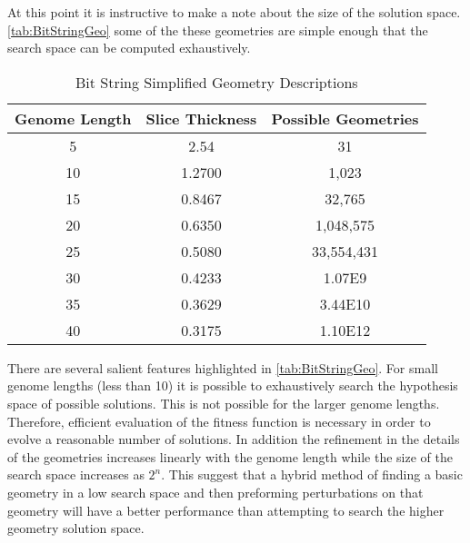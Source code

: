 At this point it is instructive to make a note about the size of the solution space.
\autoref{tab:BitStringGeo} some of the these geometries are simple enough that the search space can be computed exhaustively.
\begin{table}
    \caption[Genome Bit String Geometries]{Bit String Simplified Geometry Descriptions}
    \label{tab:BitStringGeo}
    \centering
    \begin{tabular}{ c | c c}
     \toprule
     Genome Length&Slice Thickness&Possible Geometries \\
     \midrule
        5&2.54&31\\
        10&1.2700&1,023\\
        15&0.8467&32,765\\
        20&0.6350&1,048,575\\
        25&0.5080&33,554,431\\
        30&0.4233&\num{1.07E9}\\
        35&0.3629&\num{3.44E10}\\
        40&0.3175&\num{1.10E12}\\
    \bottomrule
    \end{tabular}
\end{table}
There are several salient features highlighted in \autoref{tab:BitStringGeo}.
For small genome lengths (less than 10) it is possible to exhaustively search the hypothesis space of possible solutions.
This is not possible for the larger genome lengths.
Therefore, efficient evaluation of the fitness function is necessary in order to evolve a reasonable number of solutions.
In addition the refinement in the details of the geometries increases linearly with the genome length while the size of the search space increases as $2^n$.
This suggest that a hybrid method of finding a basic geometry in a low search space and then preforming perturbations on that geometry will have a better performance than attempting to search the higher geometry solution space.

